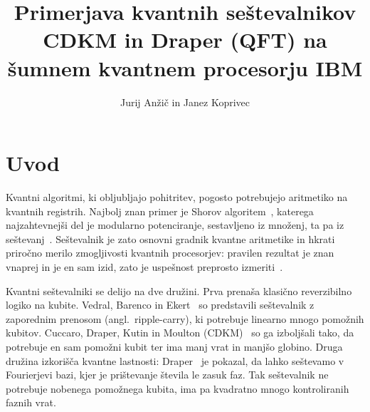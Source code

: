 
\graphicspath{{Skupina08/img/}}

\title{Primerjava kvantnih seštevalnikov CDKM in Draper (QFT) na šumnem kvantnem procesorju IBM}
\author{Jurij Anžič in Janez Koprivec}
\maketitle



\section{Uvod}
\label{g08:sec:uvod}

Kvantni algoritmi, ki obljubljajo pohitritev, pogosto potrebujejo aritmetiko na kvantnih registrih. Najbolj znan primer je Shorov algoritem~\cite{shor1997}, katerega najzahtevnejši del je modularno potenciranje, sestavljeno iz množenj, ta pa iz seštevanj~\cite{g08:vedral1996}. Seštevalnik je zato osnovni gradnik kvantne aritmetike in hkrati priročno merilo zmogljivosti kvantnih procesorjev: pravilen rezultat je znan vnaprej in je en sam izid, zato je uspešnost preprosto izmeriti~\cite{g08:nishio2020}.

Kvantni seštevalniki se delijo na dve družini. Prva prenaša klasično reverzibilno logiko na kubite. Vedral, Barenco in Ekert~\cite{g08:vedral1996} so predstavili seštevalnik z zaporednim prenosom (angl.\ ripple-carry), ki potrebuje linearno mnogo pomožnih kubitov. Cuccaro, Draper, Kutin in Moulton (CDKM)~\cite{g08:cuccaro2004} so ga izboljšali tako, da potrebuje en sam pomožni kubit ter ima manj vrat in manjšo globino. Druga družina izkorišča kvantne lastnosti: Draper~\cite{g08:draper2000} je pokazal, da lahko seštevamo v Fourierjevi bazi, kjer je prištevanje števila le zasuk faz. Tak seštevalnik ne potrebuje nobenega pomožnega kubita, ima pa kvadratno mnogo kontroliranih faznih vrat.


